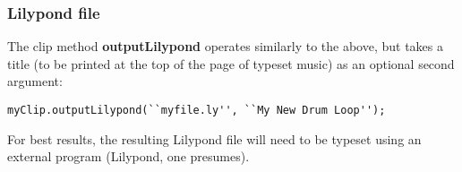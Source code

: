 \subsubsection{Lilypond file}

The clip method \textbf{outputLilypond} operates similarly to the above, but takes a title (to be printed at the top of the page of typeset music) as an optional second argument:

\begin{verbatim}
myClip.outputLilypond(``myfile.ly'', ``My New Drum Loop'');
\end{verbatim}

For best results, the resulting Lilypond file will need to be typeset using an external program (Lilypond, one presumes).

\clearpage
